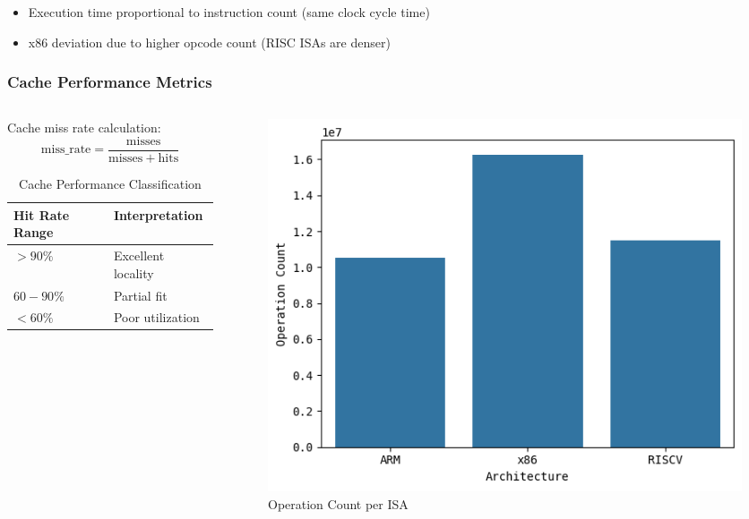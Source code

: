 \begin{frame}
	\begin{itemize}
		\item Execution time proportional to instruction count (same clock cycle time)
		\item x86 deviation due to higher opcode count (RISC ISAs are denser)
	\end{itemize}
\end{frame}

\begin{frame}[fragile]
	\frametitle{Cache Performance Metrics}
	\begin{columns}
		\begin{column}{0.5\textwidth}
			Cache miss rate calculation:
			\begin{equation*}
				\mathrm{miss\_rate} = \frac{\mathrm{misses}}{\mathrm{misses} + \mathrm{hits}}
			\end{equation*}

			\begin{table}[h]
				\centering
				\caption{Cache Performance Classification}
				\begin{tabular}{ll}
					\toprule
					Hit Rate Range & Interpretation     \\
					\midrule
					$>90\%$        & Excellent locality \\
					$60-90\%$      & Partial fit        \\
					$<60\%$        & Poor utilization   \\
					\bottomrule
				\end{tabular}
			\end{table}
		\end{column}

		\begin{column}{0.4\textwidth}
			\begin{figure}[h]
				\includegraphics[width=\linewidth]{images/op_count.png}
				\caption{Operation Count per ISA}
			\end{figure}
		\end{column}
	\end{columns}


\end{frame}
